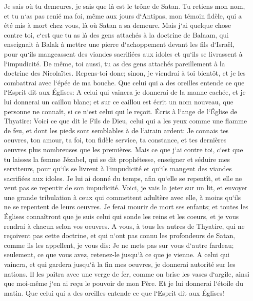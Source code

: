 \verse Je sais où tu demeures, je sais que là est le trône de Satan. Tu retiens mon nom, et tu n`as pas renié ma foi, même aux jours d`Antipas, mon témoin fidèle, qui a été mis à mort chez vous, là où Satan a sa demeure. 
\verse Mais j`ai quelque chose contre toi, c`est que tu as là des gens attachés à la doctrine de Balaam, qui enseignait à Balak à mettre une pierre d`achoppement devant les fils d`Israël, pour qu`ils mangeassent des viandes sacrifiées aux idoles et qu`ils se livrassent à l`impudicité. 
\verse De même, toi aussi, tu as des gens attachés pareillement à la doctrine des Nicolaïtes. 
\verse Repens-toi donc; sinon, je viendrai à toi bientôt, et je les combattrai avec l`épée de ma bouche. 
\verse Que celui qui a des oreilles entende ce que l`Esprit dit aux Églises: A celui qui vaincra je donnerai de la manne cachée, et je lui donnerai un caillou blanc; et sur ce caillou est écrit un nom nouveau, que personne ne connaît, si ce n`est celui qui le reçoit. 
\verse Écris à l`ange de l`Église de Thyatire: Voici ce que dit le Fils de Dieu, celui qui a les yeux comme une flamme de feu, et dont les pieds sont semblables à de l`airain ardent: 
\verse Je connais tes oeuvres, ton amour, ta foi, ton fidèle service, ta constance, et tes dernières oeuvres plus nombreuses que les premières. 
\verse Mais ce que j`ai contre toi, c`est que tu laisses la femme Jézabel, qui se dit prophétesse, enseigner et séduire mes serviteurs, pour qu`ils se livrent à l`impudicité et qu`ils mangent des viandes sacrifiées aux idoles. 
\verse Je lui ai donné du temps, afin qu`elle se repentît, et elle ne veut pas se repentir de son impudicité. 
\verse Voici, je vais la jeter sur un lit, et envoyer une grande tribulation à ceux qui commettent adultère avec elle, à moins qu`ils ne se repentent de leurs oeuvres. 
\verse Je ferai mourir de mort ses enfants; et toutes les Églises connaîtront que je suis celui qui sonde les reins et les coeurs, et je vous rendrai à chacun selon vos oeuvres. 
\verse A vous, à tous les autres de Thyatire, qui ne reçoivent pas cette doctrine, et qui n`ont pas connu les profondeurs de Satan, comme ils les appellent, je vous dis: Je ne mets pas sur vous d`autre fardeau; 
\verse seulement, ce que vous avez, retenez-le jusqu`à ce que je vienne. 
\verse A celui qui vaincra, et qui gardera jusqu`à la fin mes oeuvres, je donnerai autorité sur les nations. 
\verse Il les paîtra avec une verge de fer, comme on brise les vases d`argile, ainsi que moi-même j`en ai reçu le pouvoir de mon Père. 
\verse Et je lui donnerai l`étoile du matin. 
\verse Que celui qui a des oreilles entende ce que l`Esprit dit aux Églises! 

